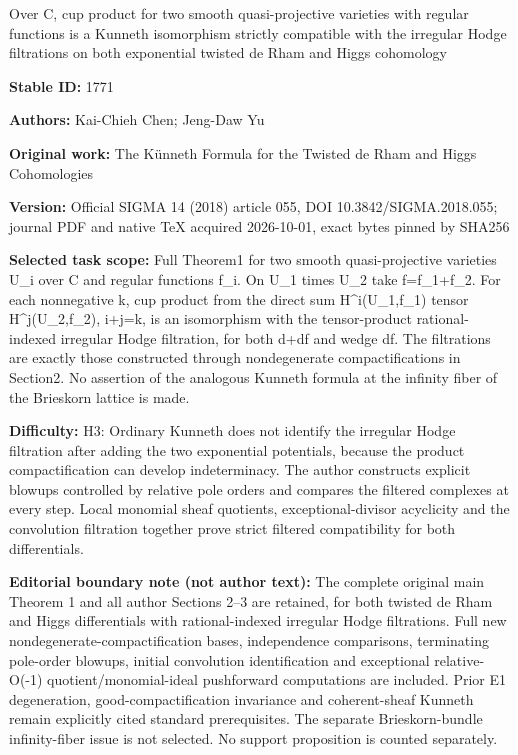 \documentclass[11pt]{article}
\begin{document}
\begin{center}\Large Over C, cup product for two smooth quasi-projective varieties with regular functions is a Kunneth isomorphism strictly compatible with the irregular Hodge filtrations on both exponential twisted de Rham and Higgs cohomology\end{center}
\noindent\textbf{Stable ID:} 1771\par
\noindent\textbf{Authors:} Kai-Chieh Chen; Jeng-Daw Yu\par
\noindent\textbf{Original work:} The Künneth Formula for the Twisted de Rham and Higgs Cohomologies\par
\noindent\textbf{Version:} Official SIGMA 14 (2018) article 055, DOI 10.3842/SIGMA.2018.055; journal PDF and native TeX acquired 2026-10-01, exact bytes pinned by SHA256\par
\noindent\textbf{Selected task scope:} Full Theorem1 for two smooth quasi-projective varieties U\_i over C and regular functions f\_i. On U\_1 times U\_2 take f=f\_1+f\_2. For each nonnegative k, cup product from the direct sum H\textasciicircum{}i(U\_1,f\_1) tensor H\textasciicircum{}j(U\_2,f\_2), i+j=k, is an isomorphism with the tensor-product rational-indexed irregular Hodge filtration, for both d+df and wedge df. The filtrations are exactly those constructed through nondegenerate compactifications in Section2. No assertion of the analogous Kunneth formula at the infinity fiber of the Brieskorn lattice is made.\par
\noindent\textbf{Difficulty:} H3: Ordinary Kunneth does not identify the irregular Hodge filtration after adding the two exponential potentials, because the product compactification can develop indeterminacy. The author constructs explicit blowups controlled by relative pole orders and compares the filtered complexes at every step. Local monomial sheaf quotients, exceptional-divisor acyclicity and the convolution filtration together prove strict filtered compatibility for both differentials.\par
\noindent\textbf{Editorial boundary note (not author text):} The complete original main Theorem 1 and all author Sections 2–3 are retained, for both twisted de Rham and Higgs differentials with rational-indexed irregular Hodge filtrations. Full new nondegenerate-compactification bases, independence comparisons, terminating pole-order blowups, initial convolution identification and exceptional relative-O(-1) quotient/monomial-ideal pushforward computations are included. Prior E1 degeneration, good-compactification invariance and coherent-sheaf Kunneth remain explicitly cited standard prerequisites. The separate Brieskorn-bundle infinity-fiber issue is not selected. No support proposition is counted separately.\par
\end{document}

